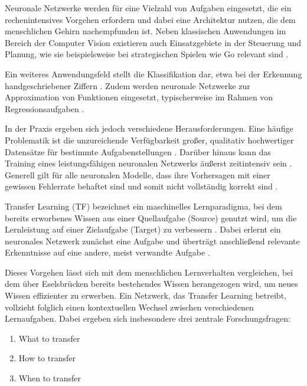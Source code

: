 Neuronale Netzwerke werden für eine Vielzahl von Aufgaben eingesetzt, die ein rechenintensives Vorgehen erfordern und dabei eine Architektur 
nutzen, die dem menschlichen Gehirn nachempfunden ist. Neben klassischen Anwendungen im Bereich der Computer Vision existieren auch 
Einsatzgebiete in der Steuerung und Planung, wie sie beispielsweise bei strategischen Spielen wie Go relevant sind 
\cite{deep_neural_networks_scientific_models}.

Ein weiteres Anwendungsfeld stellt die Klassifikation dar, etwa bei der Erkennung handgeschriebener Ziffern \cite{handwritten_digit}. 
Zudem werden neuronale Netzwerke zur Approximation von Funktionen eingesetzt, typischerweise im Rahmen von Regressionsaufgaben \cite{Gen_Reg}.

In der Praxis ergeben sich jedoch verschiedene Herausforderungen. Eine häufige Problematik ist die unzureichende Verfügbarkeit großer, 
qualitativ hochwertiger Datensätze für bestimmte Aufgabenstellungen \cite{survey_transfer}. Darüber hinaus kann das Training eines 
leistungsfähigen neuronalen Netzwerks äußerst zeitintensiv sein \cite{cascor}. Generell gilt für alle neuronalen Modelle, dass ihre 
Vorhersagen mit einer gewissen Fehlerrate behaftet sind und somit nicht vollständig korrekt sind \cite{EvoClassAndReg}.

Transfer Learning (TF) bezeichnet ein maschinelles Lernparadigma, bei dem bereits erworbenes Wissen aus einer Quellaufgabe (Source) genutzt 
wird, um die Lernleistung auf einer Zielaufgabe (Target) zu verbessern \cite{transfer_learning}. Dabei erlernt ein neuronales Netzwerk 
zunächst eine Aufgabe und überträgt anschließend relevante Erkenntnisse auf eine andere, meist verwandte Aufgabe \cite{phd_deep_cascade}.

Dieses Vorgehen lässt sich mit dem menschlichen Lernverhalten vergleichen, bei dem über Eselsbrücken bereits bestehendes Wissen herangezogen 
wird, um neues Wissen effizienter zu erwerben. Ein Netzwerk, das Transfer Learning betreibt, vollzieht folglich einen kontextuellen Wechsel 
zwischen verschiedenen Lernaufgaben. Dabei ergeben sich insbesondere drei zentrale Forschungsfragen:

\begin{enumerate}
    \item What to transfer
    \item How to transfer
    \item When to transfer
\end{enumerate}
\cite{survey_transfer}

